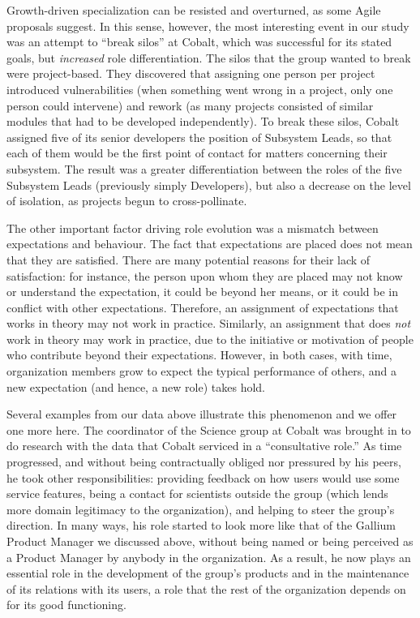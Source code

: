 \documentclass[10pt, conference, compsocconf]{IEEEtran}
\begin{document}
Growth-driven specialization can be resisted and overturned, as some Agile proposals suggest. In this sense, however, the most interesting event in our study was an attempt to ``break silos'' at Cobalt, which was successful for its stated goals, but \emph{increased} role differentiation. The silos that the group wanted to break were project-based. They discovered that assigning one person per project introduced vulnerabilities (when something went wrong in a project, only one person could intervene) and rework (as many projects consisted of similar modules that had to be developed independently). To break these silos, Cobalt assigned five of its senior developers the position of Subsystem Leads, so that each of them would be the first point of contact for matters concerning their subsystem. The result was a greater differentiation between the roles of the five Subsystem Leads (previously simply Developers), but also a decrease on the level of isolation, as projects begun to cross-pollinate.

The other important factor driving role evolution was a mismatch between expectations and behaviour. The fact that expectations are placed does not mean that they are satisfied. There are many potential reasons for their lack of satisfaction: for instance, the person upon whom they are placed may not know or understand the expectation, it could be beyond her means, or it could be in conflict with other expectations. Therefore, an assignment of expectations that works in theory may not work in practice. Similarly, an assignment that does \emph{not} work in theory may work in practice, due to the initiative or motivation of people who contribute beyond their expectations. However, in both cases, with time, organization members grow to expect the typical performance of others, and a new expectation (and hence, a new role) takes hold.

Several examples from our data above illustrate this phenomenon and we offer one more here. The coordinator of the Science group at Cobalt was brought in to do research with the data that Cobalt serviced in a ``consultative role.'' As time progressed, and without being contractually obliged nor pressured by his peers, he took other responsibilities: providing feedback on how users would use some service features, being a contact for scientists outside the group (which lends more domain legitimacy to the organization), and helping to steer the group's direction. In many ways, his role started to look more like that of the Gallium Product Manager we discussed above, without being named or being perceived as a Product Manager by anybody in the organization. As a result, he now plays an essential role in the development of the group's products and in the maintenance of its relations with its users, a role that the rest of the organization depends on for its good functioning.
\end{document}
